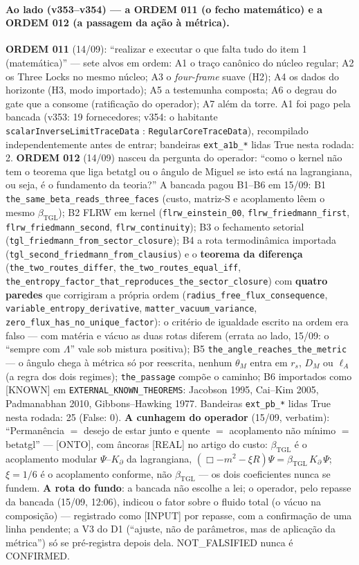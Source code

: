 \documentclass[11pt]{article}
\newcommand{\bTGL}{\beta_{\mathrm{TGL}}}\newcommand{\Msun}{M_{\odot}}\newcommand{\TGL}{\mathrm{TGL}}
\theoremstyle{definition}\newtheorem{deriv}{Derivação}
\begin{document}
\paragraph*{Ao lado (v353--v354) --- a ORDEM 011 (o fecho matemático) e a ORDEM 012 (a passagem da ação à métrica).} \textbf{ORDEM 011} (14/09): ``realizar e executar o que falta tudo do item 1 (matemática)'' --- sete alvos em ordem: A1 o traço canônico do núcleo regular; A2 os Three Locks no mesmo núcleo; A3 o \emph{four-frame} suave (H2); A4 os dados do horizonte (H3, modo importado); A5 a testemunha composta; A6 o degrau do gate que a consome (ratificação do operador); A7 além da torre. A1 foi pago pela bancada (v353: 19 fornecedores; v354: o habitante \texttt{scalarInverseLimitTraceData} : \texttt{RegularCoreTraceData}), recompilado independentemente antes de entrar; bandeiras \texttt{ext\_a1b\_*} lidas True nesta rodada: 2. \textbf{ORDEM 012} (14/09) nasceu da pergunta do operador: ``como o kernel não tem o teorema que liga betatgl ou o ângulo de Miguel se isto está na lagrangiana, ou seja, é o fundamento da teoria?'' A bancada pagou B1--B6 em 15/09: B1 \texttt{the\_same\_beta\_reads\_three\_faces} (custo, matriz-S e acoplamento lêem o mesmo $\bTGL$); B2 FLRW em kernel (\texttt{flrw\_einstein\_00}, \texttt{flrw\_friedmann\_first}, \texttt{flrw\_friedmann\_second}, \texttt{flrw\_continuity}); B3 o fechamento setorial (\texttt{tgl\_friedmann\_from\_sector\_closure}); B4 a rota termodinâmica importada (\texttt{tgl\_second\_friedmann\_from\_clausius}) e o \textbf{teorema da diferença} (\texttt{the\_two\_routes\_differ}, \texttt{the\_two\_routes\_equal\_iff}, \texttt{the\_entropy\_factor\_that\_reproduces\_the\_sector\_closure}) com \textbf{quatro paredes} que corrigiram a própria ordem (\texttt{radius\_free\_flux\_consequence}, \texttt{variable\_entropy\_derivative}, \texttt{matter\_vacuum\_variance}, \texttt{zero\_flux\_has\_no\_unique\_factor}): o critério de igualdade escrito na ordem era falso --- com matéria e vácuo as duas rotas diferem (errata ao lado, 15/09: o ``sempre com $\Lambda$'' vale sob mistura positiva); B5 \texttt{the\_angle\_reaches\_the\_metric} --- o ângulo chega à métrica só por reescrita, nenhum $\theta_M$ entra em $r_s$, $D_M$ ou $\ell_A$ (a regra dos dois regimes); \texttt{the\_passage} compõe o caminho; B6 importados como [KNOWN] em \texttt{EXTERNAL\_KNOWN\_THEOREMS}: Jacobson 1995, Cai--Kim 2005, Padmanabhan 2010, Gibbons--Hawking 1977. Bandeiras \texttt{ext\_pb\_*} lidas True nesta rodada: 25 (False: 0). \textbf{A cunhagem do operador} (15/09, verbatim): ``Permanência $=$ desejo de estar junto e quente $=$ acoplamento não mínimo $=$ betatgl'' --- [ONTO], com âncoras [REAL] no artigo do custo: $\bTGL$ é o acoplamento modular $\Psi$--$K_\partial$ da lagrangiana, $(\Box - m^2 - \xi R)\Psi = \bTGL\,K_\partial\,\Psi$; $\xi=1/6$ é o acoplamento conforme, não $\bTGL$ --- os dois coeficientes nunca se fundem. \textbf{A rota do fundo}: a bancada não escolhe a lei; o operador, pelo repasse da bancada (15/09, 12:06), indicou o fator sobre o fluido total (o vácuo na composição) --- registrado como [INPUT] por repasse, com a confirmação de uma linha pendente; a V3 do D1 (``ajuste, não de parâmetros, mas de aplicação da métrica'') só se pré-registra depois dela. NOT\_FALSIFIED nunca é CONFIRMED.
\end{document}
